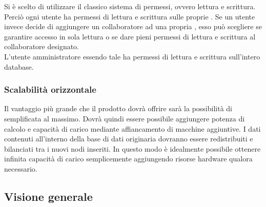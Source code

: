 \documentclass{scalatekids-article}
\begin{document}
Si è scelto di utilizzare il classico sistema di permessi, ovvero lettura e scrittura. Perciò ogni utente ha permessi di lettura e scrittura sulle proprie . Se un utente invece decide di aggiungere un collaboratore ad una propria , esso può scegliere se garantire accesso in sola lettura o se dare pieni permessi di lettura e scrittura al collaboratore designato.\\L'utente amministratore essendo tale ha permessi di lettura e scrittura sull'intero database.\\


\subsubsection{Scalabilità orizzontale}

Il vantaggio più grande che il prodotto dovrà offrire sarà la possibilità di
 semplificata al massimo. Dovrà quindi essere possibile
aggiungere potenza di calcolo e capacità di carico mediante affiancamento di
macchine aggiuntive. I dati contenuti all'interno della base di dati originaria
dovranno essere redistribuiti e bilanciati tra i nuovi nodi inseriti. In questo
modo è idealmente possibile ottenere infinita capacità di carico semplicemente
aggiungendo risorse hardware qualora necessario.

\subsection{Visione generale}
\end{document}
